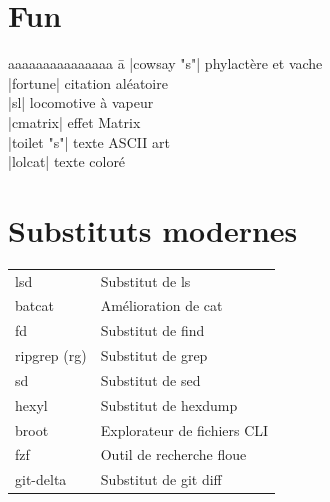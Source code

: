 \documentclass{article}
\begin{document}
\begin{multicols}{4}
    \section*{Fun}

    \begin{tabbing}
        aaaaaaaaaaaaaaa \= a \kill
        \code|cowsay "s"| \> phylactère et vache \\
        \code|fortune| \> citation aléatoire  \\
        \code|sl| \> locomotive à vapeur  \\
        \code|cmatrix| \> effet Matrix  \\
        \code|toilet "s"| \> texte ASCII art  \\
        \code|lolcat| \> texte coloré
    \end{tabbing}

    \section*{Substituts modernes}

    \begin{tabularx}{\columnwidth}{lX}
        lsd          & Substitut de ls             \\
        batcat       & Amélioration de cat         \\
        fd           & Substitut de find           \\
        ripgrep (rg) & Substitut de grep           \\
        sd           & Substitut de sed            \\
        hexyl        & Substitut de hexdump        \\
        broot        & Explorateur de fichiers CLI \\
        fzf          & Outil de recherche floue    \\
        git-delta    & Substitut de git diff       \\
    \end{tabularx}

\end{multicols}
\end{document}
